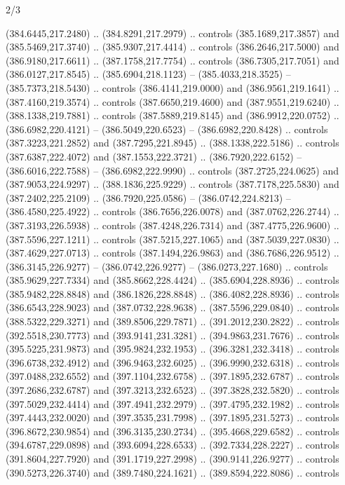 \begin{flagdescription}{2/3}
\begin{scope}[xshift=0.5\flaglength,yshift=0.5\flagwidth,scale=\flagwidth/495.65]
\begin{scope}[y=0.8pt, x=0.8pt, yscale=-1,shift={(-463.76,-309.78)}]
  (384.6445,217.2480) .. (384.8291,217.2979) .. controls (385.1689,217.3857) and
  (385.5469,217.3740) .. (385.9307,217.4414) .. controls (386.2646,217.5000) and
  (386.9180,217.6611) .. (387.1758,217.7754) .. controls (386.7305,217.7051) and
  (386.0127,217.8545) .. (385.6904,218.1123) -- (385.4033,218.3525) --
  (385.7373,218.5430) .. controls (386.4141,219.0000) and (386.9561,219.1641) ..
  (387.4160,219.3574) .. controls (387.6650,219.4600) and (387.9551,219.6240) ..
  (388.1338,219.7881) .. controls (387.5889,219.8145) and (386.9912,220.0752) ..
  (386.6982,220.4121) -- (386.5049,220.6523) -- (386.6982,220.8428) .. controls
  (387.3223,221.2852) and (387.7295,221.8945) .. (388.1338,222.5186) .. controls
  (387.6387,222.4072) and (387.1553,222.3721) .. (386.7920,222.6152) --
  (386.6016,222.7588) -- (386.6982,222.9990) .. controls (387.2725,224.0625) and
  (387.9053,224.9297) .. (388.1836,225.9229) .. controls (387.7178,225.5830) and
  (387.2402,225.2109) .. (386.7920,225.0586) -- (386.0742,224.8213) --
  (386.4580,225.4922) .. controls (386.7656,226.0078) and (387.0762,226.2744) ..
  (387.3193,226.5938) .. controls (387.4248,226.7314) and (387.4775,226.9600) ..
  (387.5596,227.1211) .. controls (387.5215,227.1065) and (387.5039,227.0830) ..
  (387.4629,227.0713) .. controls (387.1494,226.9863) and (386.7686,226.9512) ..
  (386.3145,226.9277) -- (386.0742,226.9277) -- (386.0273,227.1680) .. controls
  (385.9629,227.7334) and (385.8662,228.4424) .. (385.6904,228.8936) .. controls
  (385.9482,228.8848) and (386.1826,228.8848) .. (386.4082,228.8936) .. controls
  (386.6543,228.9023) and (387.0732,228.9638) .. (387.5596,229.0840) .. controls
  (388.5322,229.3271) and (389.8506,229.7871) .. (391.2012,230.2822) .. controls
  (392.5518,230.7773) and (393.9141,231.3281) .. (394.9863,231.7676) .. controls
  (395.5225,231.9873) and (395.9824,232.1953) .. (396.3281,232.3418) .. controls
  (396.6738,232.4912) and (396.9463,232.6025) .. (396.9990,232.6318) .. controls
  (397.0488,232.6552) and (397.1104,232.6758) .. (397.1895,232.6787) .. controls
  (397.2686,232.6787) and (397.3213,232.6523) .. (397.3828,232.5820) .. controls
  (397.5029,232.4414) and (397.4941,232.2979) .. (397.4795,232.1982) .. controls
  (397.4443,232.0020) and (397.3535,231.7998) .. (397.1895,231.5273) .. controls
  (396.8672,230.9854) and (396.3135,230.2734) .. (395.4668,229.6582) .. controls
  (394.6787,229.0898) and (393.6094,228.6533) .. (392.7334,228.2227) .. controls
  (391.8604,227.7920) and (391.1719,227.2998) .. (390.9141,226.9277) .. controls
  (390.5273,226.3740) and (389.7480,224.1621) .. (389.8594,222.8086) .. controls

\end{scope}
\end{scope}
\end{flagdescription}
